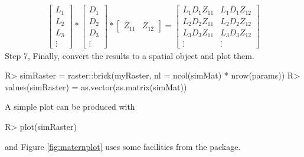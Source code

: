 \documentclass[article,nojss]{jss}\usepackage[]{graphicx}\usepackage[]{color}
\begin{document}
\begin{gather}
 \begin{bmatrix}  L_{1} \\ L_{2} \\L_{3} \\ \vdots
 \end{bmatrix} 
 *
  \begin{bmatrix}
   D_{1} \\ D_{2} \\D_{3} \\ \vdots
   \end{bmatrix} 
   *
   \begin{bmatrix}
   Z_{11} & Z_{12}
   \end{bmatrix}
  =
 \begin{bmatrix}
   L_1D_1Z_{11} & L_1D_1Z_{12} \\
   L_2D_2Z_{11} & L_2D_2Z_{12} \\
   L_3D_3Z_{11} & L_3D_3Z_{12} \\
   \vdots  &   \vdots
  \end{bmatrix}
\end{gather}
Step 7, Finally, convert the results to a spatial  object and plot them.
\begin{CodeChunk}
\begin{CodeInput}
R> simRaster = raster::brick(myRaster, nl = ncol(simMat) * nrow(params))
R> values(simRaster) = as.vector(as.matrix(simMat))
\end{CodeInput} 
\end{CodeChunk} 

A simple plot can be produced with
\begin{CodeChunk}
\begin{CodeInput}
R> plot(simRaster)
\end{CodeInput} 
\end{CodeChunk} 

and
Figure \ref{fig:maternplot} uses some facilities from the  \citep{mapmiscPackage} package.
\end{document}
